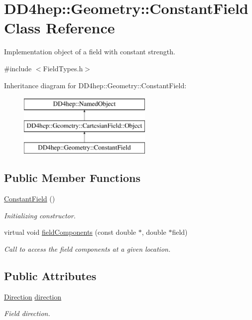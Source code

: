 \hypertarget{class_d_d4hep_1_1_geometry_1_1_constant_field}{}\section{D\+D4hep\+:\+:Geometry\+:\+:Constant\+Field Class Reference}
\label{class_d_d4hep_1_1_geometry_1_1_constant_field}


Implementation object of a field with constant strength.  




{\ttfamily \#include $<$Field\+Types.\+h$>$}

Inheritance diagram for D\+D4hep\+:\+:Geometry\+:\+:Constant\+Field\+:\begin{figure}[H]
\begin{center}
\leavevmode
\includegraphics[height=3.000000cm]{class_d_d4hep_1_1_geometry_1_1_constant_field}
\end{center}
\end{figure}
\subsection*{Public Member Functions}
\begin{DoxyCompactItemize}
\item 
\hyperlink{class_d_d4hep_1_1_geometry_1_1_constant_field_a2fb76b37024098548c0a190666c8d30a}{Constant\+Field} ()
\begin{DoxyCompactList}\small\item\em Initializing constructor. \end{DoxyCompactList}\item 
virtual void \hyperlink{class_d_d4hep_1_1_geometry_1_1_constant_field_a512fc8911c0c3e710b363c455c2c9ea9}{field\+Components} (const double $\ast$, double $\ast$field)
\begin{DoxyCompactList}\small\item\em Call to access the field components at a given location. \end{DoxyCompactList}\end{DoxyCompactItemize}
\subsection*{Public Attributes}
\begin{DoxyCompactItemize}
\item 
\hyperlink{namespace_d_d4hep_1_1_geometry_a56730a0ddb9f3f089c415cd693bd7c19}{Direction} \hyperlink{class_d_d4hep_1_1_geometry_1_1_constant_field_a986d167280511c4650ffa950188cdef7}{direction}
\begin{DoxyCompactList}\small\item\em Field direction. \end{DoxyCompactList}\end{DoxyCompactItemize}


